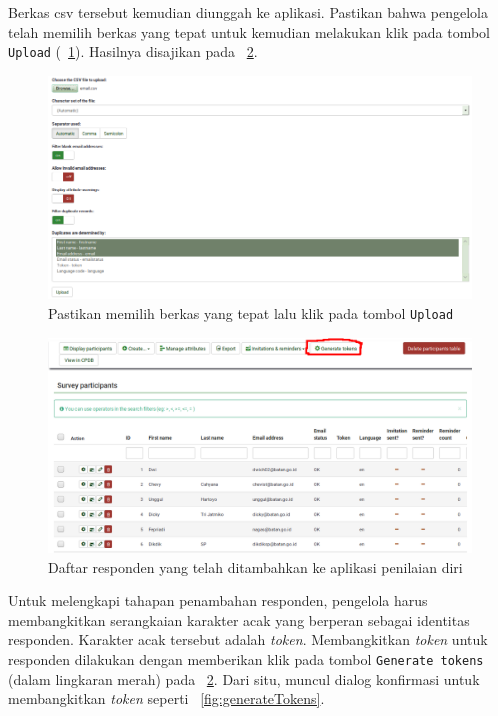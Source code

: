 Berkas csv tersebut kemudian diunggah ke aplikasi. Pastikan bahwa pengelola telah memilih berkas yang tepat untuk kemudian melakukan klik pada tombol \texttt{Upload} (\figurename~\ref{fig:csvFile2}). Hasilnya disajikan pada \figurename~\ref{fig:addResponden2}.

\begin{figure}
  \begin{center}
    \includegraphics[scale=.5]{pics/csvFile2.png}
    \caption{Pastikan memilih berkas yang tepat lalu klik pada tombol \texttt{Upload}}
    \label{fig:csvFile2}
  \end{center}
\end{figure}

\begin{figure}
  \begin{center}
    \includegraphics[scale=.5]{pics/addResponden2.png}
    \caption{Daftar responden yang telah ditambahkan ke aplikasi penilaian diri}
    \label{fig:addResponden2}
  \end{center}
\end{figure}

Untuk melengkapi tahapan penambahan responden, pengelola harus membangkitkan serangkaian karakter acak yang berperan sebagai identitas responden. Karakter acak tersebut adalah \textit{token}. Membangkitkan \textit{token} untuk responden dilakukan dengan memberikan klik pada tombol \texttt{Generate tokens} (dalam lingkaran merah) pada \figurename~\ref{fig:addResponden2}. Dari situ, muncul dialog konfirmasi untuk membangkitkan \textit{token} seperti \figurename~\ref{fig:generateTokens}.

